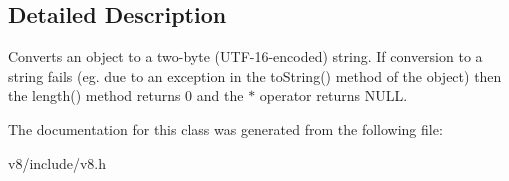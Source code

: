 \subsection{Detailed Description}
Converts an object to a two-\/byte (U\+T\+F-\/16-\/encoded) string. If conversion to a string fails (eg. due to an exception in the to\+String() method of the object) then the length() method returns 0 and the $\ast$ operator returns N\+U\+LL. 

The documentation for this class was generated from the following file\+:\begin{DoxyCompactItemize}
\item 
v8/include/v8.\+h\end{DoxyCompactItemize}
